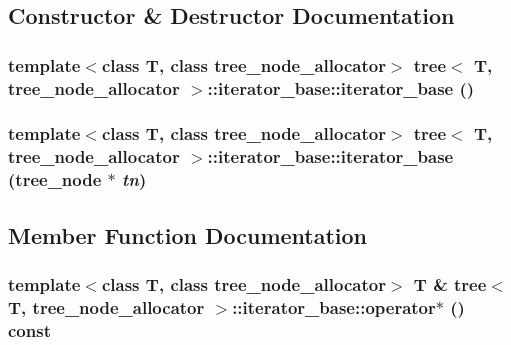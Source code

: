 \subsection{Constructor \& Destructor Documentation}
\hypertarget{classtree_1_1iterator__base_1be2e6802acca5f281ddc7e5d67bd61c}{
\subsubsection{\setlength{\rightskip}{0pt plus 5cm}template$<$class T, class tree\_\-node\_\-allocator$>$ {\bf tree}$<$ T, tree\_\-node\_\-allocator $>$::iterator\_\-base::iterator\_\-base ()}}
\label{classtree_1_1iterator__base_1be2e6802acca5f281ddc7e5d67bd61c}


\hypertarget{classtree_1_1iterator__base_dd6dda19c2febebabbc5e769365dc4dd}{
\subsubsection{\setlength{\rightskip}{0pt plus 5cm}template$<$class T, class tree\_\-node\_\-allocator$>$ {\bf tree}$<$ T, tree\_\-node\_\-allocator $>$::iterator\_\-base::iterator\_\-base ({\bf tree\_\-node} $\ast$ {\em tn})}}
\label{classtree_1_1iterator__base_dd6dda19c2febebabbc5e769365dc4dd}




\subsection{Member Function Documentation}
\hypertarget{classtree_1_1iterator__base_2706c00219d33faae9edb1a13d132608}{
\subsubsection{\setlength{\rightskip}{0pt plus 5cm}template$<$class T, class tree\_\-node\_\-allocator$>$ T \& {\bf tree}$<$ T, tree\_\-node\_\-allocator $>$::iterator\_\-base::operator$\ast$ () const}}
\label{classtree_1_1iterator__base_2706c00219d33faae9edb1a13d132608}


